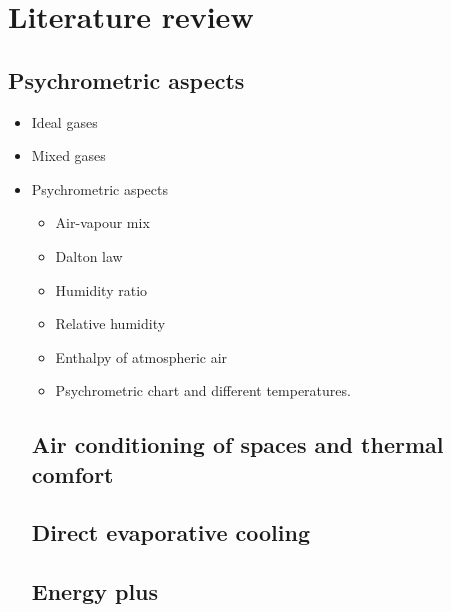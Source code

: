 \chapter{Literature review}
\label{chap:review}



\section{Psychrometric aspects}
\begin{itemize}
	\item Ideal gases
	\item Mixed gases
	\item Psychrometric aspects
			\begin{itemize}
				\item Air-vapour mix
				\item Dalton law
				\item Humidity ratio
				\item Relative humidity
				\item Enthalpy of atmospheric air
				\item Psychrometric chart and 							different temperatures.
			\end{itemize}
		
\section{Air conditioning of spaces and thermal comfort}

\section{Direct evaporative cooling}

\section{Energy plus}
\end{itemize}